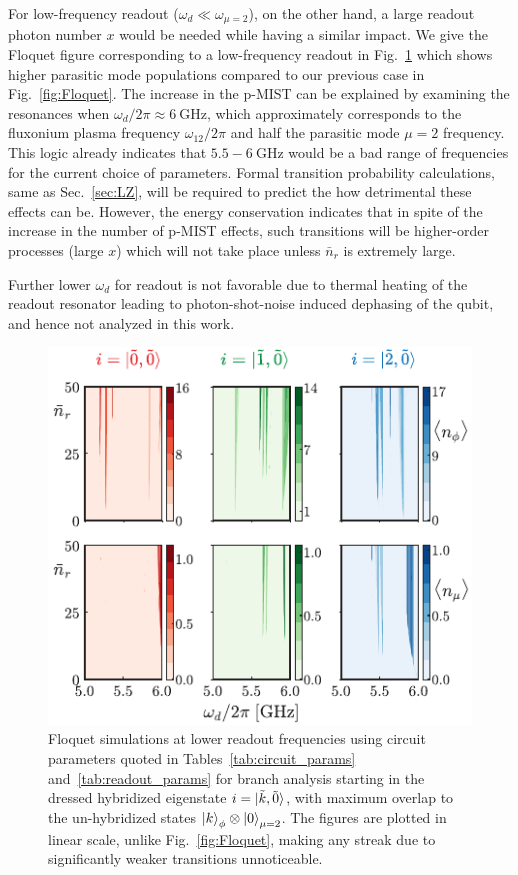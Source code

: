 \documentclass[%
reprint,
superscriptaddress,
 amsmath,amssymb,
 aps,
 prx,
longbibliography,
floatfix,
]{revtex4-2}
\begin{document}
For low-frequency readout ($\omega_d \ll \omega_{\mu = 2}$), on the other hand, a large readout photon number $x$ would be needed while having a similar impact. We give the Floquet figure corresponding to a low-frequency readout in Fig.~\ref{fig:Flo_low} which shows higher parasitic mode populations compared to our previous case in Fig.~\ref{fig:Floquet}. The increase in the p-MIST can be explained by examining the resonances when $\omega_d/2\pi \approx 6 \ \mathrm{GHz}$, which approximately corresponds to the fluxonium plasma frequency $\omega_{12}/2\pi$ and half the parasitic mode $\mu=2$ frequency. This logic already indicates that $5.5-6 \ \mathrm{GHz}$ would be a bad range of frequencies for the current choice of parameters. Formal transition probability calculations, same as Sec.~\ref{sec:LZ}, will be required to predict the how detrimental these effects can be. However, the energy conservation indicates that in spite of the increase in the number of p-MIST effects, such transitions will be higher-order processes (large $x$) which will not take place unless $\bar n_r$ is extremely large.


Further lower $\omega_d$ for readout is not favorable due to thermal heating of the readout resonator leading to photon-shot-noise induced dephasing of the qubit, and hence not analyzed in this work.  

\begin{figure}[t]
    \centering
    \includegraphics[width=\linewidth]{Figures/Floquet_low.pdf}
    \caption{Floquet simulations at lower readout frequencies using circuit parameters quoted in Tables~\ref{tab:circuit_params} and~\ref{tab:readout_params} for branch analysis starting in the dressed hybridized eigenstate $i=\ket{\tilde{k},\tilde{0}}$, with maximum overlap to the un-hybridized states $\ket{k}_\phi\otimes\ket{0}_{\mu=2}$. The figures are plotted in linear scale, unlike Fig.~\ref{fig:Floquet}, making any streak due to significantly weaker transitions unnoticeable.}
    \label{fig:Flo_low}
\end{figure}
\end{document}
